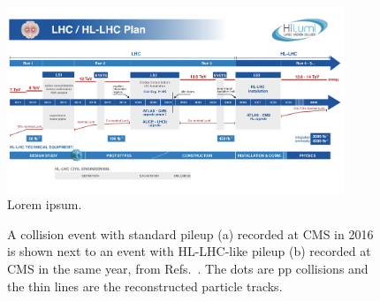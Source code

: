\begin{figure}[htb]
    \centering
    \includegraphics[width=0.9\textwidth,valign=c]{fig/lhc/hl_lhc_timeline.png}
    \caption{
        Lorem ipsum.
    }
    \label{fig:hl_lhc_timeline}
\end{figure}

\begin{figure}[!htb]
    \centering
    \qquad
    \caption{
        A collision event with standard pileup (a) recorded at CMS in 2016 is shown next to an event with HL-LHC-like pileup (b) recorded at CMS in the same year, from Refs.~\cite{NormalPU2016, HighPU2016}.
        The dots are pp collisions and the thin lines are the reconstructed particle tracks.
    }
    \label{fig:pileup}
\end{figure}

